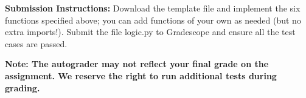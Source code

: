 \documentclass{article}
\begin{document}
    \vspace{3mm}
    \textbf{Submission Instructions:} 
    Download the template file and implement the six functions specified above; you can add functions of your own as needed (but no extra imports!). Submit the file logic.py to Gradescope and ensure all the test cases are passed. 

    \vspace{3mm}
    \textbf{Note: The autograder may not reflect your final grade on the assignment. We reserve the right to run additional tests during grading.}
    
\end{document}
